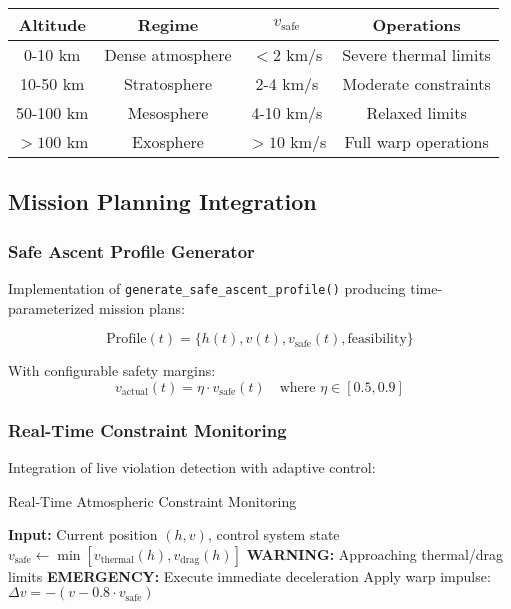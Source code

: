 \documentclass[11pt]{article}
\begin{document}
\begin{center}
\begin{tabular}{|c|c|c|c|}
\hline
\textbf{Altitude} & \textbf{Regime} & \textbf{$v_{\text{safe}}$} & \textbf{Operations} \\
\hline
0-10 km & Dense atmosphere & $<2$ km/s & Severe thermal limits \\
10-50 km & Stratosphere & 2-4 km/s & Moderate constraints \\
50-100 km & Mesosphere & 4-10 km/s & Relaxed limits \\
$>100$ km & Exosphere & $>10$ km/s & Full warp operations \\
\hline
\end{tabular}
\end{center}

\subsection{Mission Planning Integration}

\subsubsection{Safe Ascent Profile Generator}
Implementation of \texttt{generate\_safe\_ascent\_profile()} producing time-parameterized mission plans:

\begin{equation}
\text{Profile}(t) = \{h(t), v(t), v_{\text{safe}}(t), \text{feasibility}\}
\end{equation}

With configurable safety margins:
\begin{equation}
v_{\text{actual}}(t) = \eta \cdot v_{\text{safe}}(t) \quad \text{where } \eta \in [0.5, 0.9]
\end{equation}

\subsubsection{Real-Time Constraint Monitoring}
Integration of live violation detection with adaptive control:

\begin{algorithm}
\caption{Real-Time Atmospheric Constraint Monitoring}
\begin{algorithmic}
\State \textbf{Input:} Current position $(h, v)$, control system state
    \State $v_{\text{safe}} \gets \min[v_{\text{thermal}}(h), v_{\text{drag}}(h)]$
        \State \textbf{WARNING:} Approaching thermal/drag limits
    \EndIf
        \State \textbf{EMERGENCY:} Execute immediate deceleration
        \State Apply warp impulse: $\Delta v = -(v - 0.8 \cdot v_{\text{safe}})$
    \EndIf
\EndFor
\end{algorithmic}
\end{algorithm}
\end{document}
